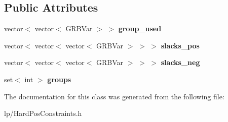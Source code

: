 \subsection*{Public Attributes}
\begin{DoxyCompactItemize}
\item 
\hypertarget{class_hard_pos_constraints_l_p_a16ba65107e587a8cb43cc10949b0ebcf}{
vector$<$ vector$<$ GRBVar $>$ $>$ {\bfseries group\_\-used}}
\label{class_hard_pos_constraints_l_p_a16ba65107e587a8cb43cc10949b0ebcf}

\item 
\hypertarget{class_hard_pos_constraints_l_p_ad3b98e9e78140b02098420c674fcbaab}{
vector$<$ vector$<$ vector$<$ GRBVar $>$ $>$ $>$ {\bfseries slacks\_\-pos}}
\label{class_hard_pos_constraints_l_p_ad3b98e9e78140b02098420c674fcbaab}

\item 
\hypertarget{class_hard_pos_constraints_l_p_ac758c0971f82ef892f7f708db15bf472}{
vector$<$ vector$<$ vector$<$ GRBVar $>$ $>$ $>$ {\bfseries slacks\_\-neg}}
\label{class_hard_pos_constraints_l_p_ac758c0971f82ef892f7f708db15bf472}

\item 
\hypertarget{class_hard_pos_constraints_l_p_aa5c46efababe8dd5282a71ceb233c548}{
set$<$ int $>$ {\bfseries groups}}
\label{class_hard_pos_constraints_l_p_aa5c46efababe8dd5282a71ceb233c548}

\end{DoxyCompactItemize}


The documentation for this class was generated from the following file:\begin{DoxyCompactItemize}
\item 
lp/HardPosConstraints.h\end{DoxyCompactItemize}
